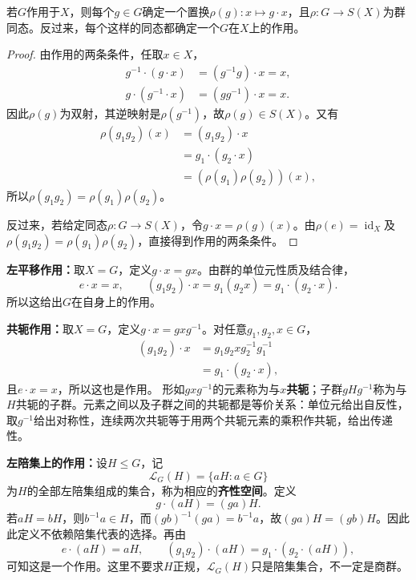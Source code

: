 \begin{proposition}
若$G$作用于$X$，则每个$g\in G$确定一个置换$\rho(g):x\mapsto g\cdot x$，且$\rho:G\to S(X)$为群同态。反过来，每个这样的同态都确定一个$G$在$X$上的作用。
\end{proposition}
\begin{proof}
由作用的两条条件，任取$x\in X$，
\begin{align*}
g^{-1}\cdot(g\cdot x)&=(g^{-1}g)\cdot x=x,\\
g\cdot(g^{-1}\cdot x)&=(gg^{-1})\cdot x=x.
\end{align*}
因此$\rho(g)$为双射，其逆映射是$\rho(g^{-1})$，故$\rho(g)\in S(X)$。又有
\begin{align*}
\rho(g_1g_2)(x)&=(g_1g_2)\cdot x\\
&=g_1\cdot(g_2\cdot x)\\
&=(\rho(g_1)\rho(g_2))(x),
\end{align*}
所以$\rho(g_1g_2)=\rho(g_1)\rho(g_2)$。

反过来，若给定同态$\rho:G\to S(X)$，令$g\cdot x=\rho(g)(x)$。由$\rho(e)=\operatorname{id}_X$及$\rho(g_1g_2)=\rho(g_1)\rho(g_2)$，直接得到作用的两条条件。
\end{proof}

\begin{example}
\textbf{左平移作用：}取$X=G$，定义$g\cdot x=gx$。由群的单位元性质及结合律，
\[
e\cdot x=x,\qquad(g_1g_2)\cdot x=g_1(g_2x)=g_1\cdot(g_2\cdot x).
\]
所以这给出$G$在自身上的作用。
\end{example}

\begin{example}
\textbf{共轭作用：}取$X=G$，定义$g\cdot x=gxg^{-1}$。对任意$g_1,g_2,x\in G$，
\begin{align*}
(g_1g_2)\cdot x
&=g_1g_2xg_2^{-1}g_1^{-1}\\
&=g_1\cdot(g_2\cdot x),
\end{align*}
且$e\cdot x=x$，所以这也是作用。
形如$gxg^{-1}$的元素称为与$x$\textbf{共轭}；子群$gHg^{-1}$称为与$H$共轭的子群。元素之间以及子群之间的共轭都是等价关系：单位元给出自反性，取$g^{-1}$给出对称性，连续两次共轭等于用两个共轭元素的乘积作共轭，给出传递性。
\end{example}

\begin{example}
\textbf{左陪集上的作用：}设$H\leq G$，记
\[
\mathcal L_G(H)=\{aH:a\in G\}
\]
为$H$的全部左陪集组成的集合，称为相应的\textbf{齐性空间}。定义
\[
g\cdot(aH)=(ga)H.
\]
若$aH=bH$，则$b^{-1}a\in H$，而$(gb)^{-1}(ga)=b^{-1}a$，故$(ga)H=(gb)H$。因此此定义不依赖陪集代表的选择。再由
\[
e\cdot(aH)=aH,\qquad
(g_1g_2)\cdot(aH)=g_1\cdot(g_2\cdot(aH)),
\]
可知这是一个作用。这里不要求$H$正规，$\mathcal L_G(H)$只是陪集集合，不一定是商群。
\end{example}

